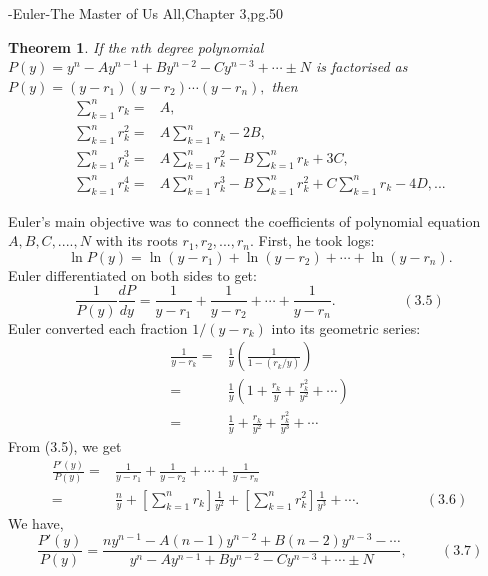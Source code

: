 \documentclass[a4paper,reqno,11pt]{amsart}
\theoremstyle{plain}%
\newtheorem{thm}{Theorem}[section]
\begin{document}
\begin{Proof}
\vspace{2ex}
\hfill{-Euler-The Master of Us All,Chapter 3,pg.50}
\begin{thm}\label{thm : Type 1}If the $n$th degree polynomial $P(y) = y^n - Ay^{n-1} + By^{n-2} - Cy^{n-3} + \cdots \pm N$ is factorised as $P(y) = (y-r_{1})(y-r_{2})\cdots(y-r_{n}),$ then 
\begin{align*}
    \sum_{k=1}^{n}r_{k} =& A,\\
    \sum_{k=1}^{n}r_{k}^2 =& A\sum_{k=1}^{n}r_{k} - 2B,\\
    \sum_{k=1}^{n}r_{k}^3 =& A\sum_{k=1}^{n}r_{k}^2 - B\sum_{k=1}^{n}r_{k} + 3C,\\
    \sum_{k=1}^{n}r_{k}^4 =& A\sum_{k=1}^{n}r_{k}^3 -B\sum_{k=1}^{n}r_{k}^2 + C\sum_{k=1}^{n}r_{k} - 4D,...
    \end{align*}
    \end{thm}
\begin{Proof}
Euler's main objective was to connect the coefficients of polynomial equation $A,B,C,....,N$ with its roots $r_{1},r_{2},...,r_{n}.$ First, he took logs:\\
$$\ln P(y) = \ln(y-r_{1}) + \ln(y-r_{2}) + \cdots +\ln(y-r_{n}).$$
Euler differentiated on both sides to get:\\
$$\frac{1}{P(y)}\frac{dP}{dy} = \frac{1}{y-r_{1}} + \frac{1}{y-r_{2}} + \cdots + \frac{1}{y-r_{n}}. \hspace{2cm} (3.5) $$
Euler converted each fraction $1/ (y -r_{k})$ into its geometric series: 
\begin{align*}
 \frac{1}{y-r_{k}} =& \frac{1}{y}\left(\frac{1}{1-(r_{k}/y)}\right)\\
 =& \frac{1}{y}\left(1 + \frac{r_{k}}{y} + \frac{r_{k}^2}{y^2} + \cdots\right)\\
 =& \frac{1}{y} + \frac{r_{k}}{y^2} + \frac{r_{k}^2}{y^3} + \cdots
 \end{align*}
 From (3.5), we get
\begin{align*}
\frac{P'(y)}{P(y)} =& \frac{1}{y-r_{1}} + \frac{1}{y-r_{2}} + \cdots + \frac{1}{y-r_{n}}\\
 =& \frac{n}{y} + [\sum_{k=1}^{n}r_{k}]\frac{1}{y^2} + [\sum_{k=1}^{n}r_{k}^2]\frac{1}{y^3} + \cdots. \hspace{2cm} (3.6)
 \end{align*}
We have,\\
$$\frac{P'(y)}{P(y)} = \frac{ny^{n-1} - A(n-1)y^{n-2} + B(n-2)y^{n-3} - \cdots}{y^n - Ay^{n-1} + By^{n-2} - Cy^{n-3} + \cdots \pm N}, \hspace{1cm} (3.7)$$

\end{Proof}
\end{Proof}
\end{document}
